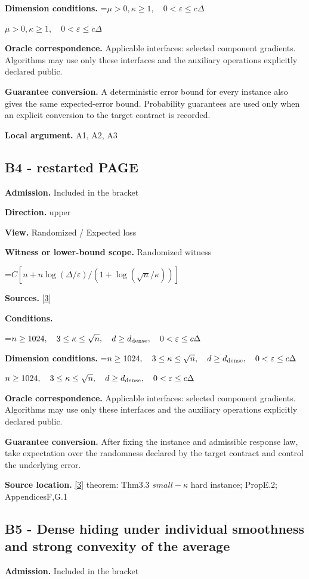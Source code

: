\documentclass[10pt,a4paper]{article}
\newcommand{\AtlasMath}[1]{\par\begingroup\centering\setbox0=\hbox{$\displaystyle #1$}\ifdim\wd0>1.4\linewidth\typeout{ATLAS WIDE FORMULA: \the\wd0}\fi\ifdim\wd0>\linewidth\resizebox{\linewidth}{!}{\box0}\else\box0\fi\par\endgroup}
\newcommand{\AtlasInlineMath}[1]{\begingroup\setbox0=\hbox{$#1$}\ifdim\wd0>.4\linewidth\endgroup\AtlasMath{#1}\else\endgroup$#1$\fi}
\begin{document}
\textbf{Dimension conditions.} \AtlasInlineMath{\mu>0,\kappa\ge1,\quad0<\varepsilon\le c\Delta}

\textbf{Oracle correspondence.} Applicable interfaces: selected component gradients. Algorithms may use only these interfaces and the auxiliary operations explicitly declared public.

\textbf{Guarantee conversion.} A deterministic error bound for every instance also gives the same expected-error bound. Probability guarantees are used only when an explicit conversion to the target contract is recorded.

\textbf{Local argument.} A1, A2, A3

\subsection{B4 - restarted PAGE}
\textbf{Admission.} Included in the bracket

\textbf{Direction.} upper

\textbf{View.} Randomized / Expected loss

\textbf{Witness or lower-bound scope.} Randomized witness

\AtlasMath{C[n+n\log(\Delta/\varepsilon)/(1+\log(\sqrt n/\kappa))]}
\textbf{Sources.} \href{https://arxiv.org/pdf/2609.00045v3}{[3]}

\textbf{Conditions.} 
\AtlasMath{n\ge1024,\quad3\le\kappa\le\sqrt n,\quad d\ge d_{\rm dense},\quad0<\varepsilon\le c\Delta}


\textbf{Dimension conditions.} \AtlasInlineMath{n\ge1024,\quad3\le\kappa\le\sqrt n,\quad d\ge d_{\rm dense},\quad0<\varepsilon\le c\Delta}

\textbf{Oracle correspondence.} Applicable interfaces: selected component gradients. Algorithms may use only these interfaces and the auxiliary operations explicitly declared public.

\textbf{Guarantee conversion.} After fixing the instance and admissible response law, take expectation over the randomness declared by the target contract and control the underlying error.

\textbf{Source location.} \href{https://arxiv.org/pdf/2609.00045v3}{[3]} theorem: Thm3.3 $small-\kappa$ hard instance; PropE.2; AppendicesF,G.1

\subsection{B5 - Dense hiding under individual smoothness and strong convexity of the average}
\textbf{Admission.} Included in the bracket
\end{document}

